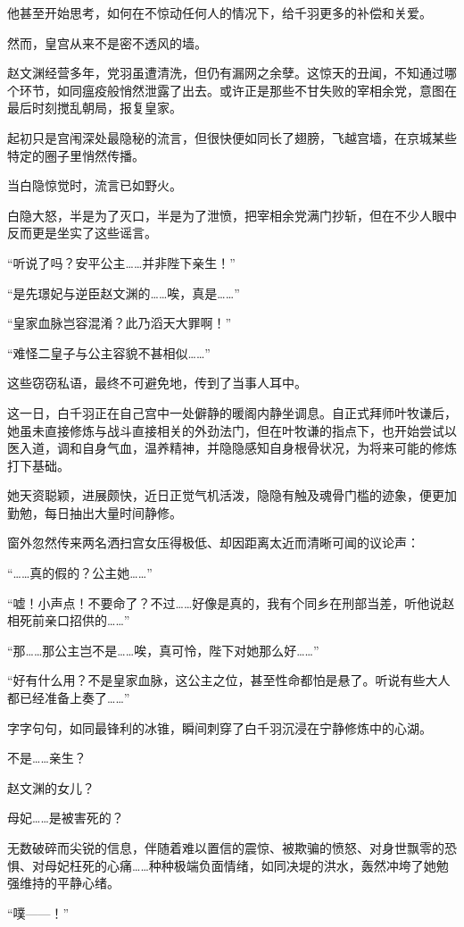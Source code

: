 他甚至开始思考，如何在不惊动任何人的情况下，给千羽更多的补偿和关爱。

然而，皇宫从来不是密不透风的墙。

赵文渊经营多年，党羽虽遭清洗，但仍有漏网之余孽。这惊天的丑闻，不知通过哪个环节，如同瘟疫般悄然泄露了出去。或许正是那些不甘失败的宰相余党，意图在最后时刻搅乱朝局，报复皇家。

起初只是宫闱深处最隐秘的流言，但很快便如同长了翅膀，飞越宫墙，在京城某些特定的圈子里悄然传播。

当白隐惊觉时，流言已如野火。

白隐大怒，半是为了灭口，半是为了泄愤，把宰相余党满门抄斩，但在不少人眼中反而更是坐实了这些谣言。

“听说了吗？安平公主……并非陛下亲生！”

“是先璟妃与逆臣赵文渊的……唉，真是……”

“皇家血脉岂容混淆？此乃滔天大罪啊！”

“难怪二皇子与公主容貌不甚相似……”

这些窃窃私语，最终不可避免地，传到了当事人耳中。

这一日，白千羽正在自己宫中一处僻静的暖阁内静坐调息。自正式拜师叶牧谦后，她虽未直接修炼与战斗直接相关的外劲法门，但在叶牧谦的指点下，也开始尝试以医入道，调和自身气血，温养精神，并隐隐感知自身根骨状况，为将来可能的修炼打下基础。

她天资聪颖，进展颇快，近日正觉气机活泼，隐隐有触及魂骨门槛的迹象，便更加勤勉，每日抽出大量时间静修。

窗外忽然传来两名洒扫宫女压得极低、却因距离太近而清晰可闻的议论声：

“……真的假的？公主她……”

“嘘！小声点！不要命了？不过……好像是真的，我有个同乡在刑部当差，听他说赵相死前亲口招供的……”

“那……那公主岂不是……唉，真可怜，陛下对她那么好……”

“好有什么用？不是皇家血脉，这公主之位，甚至性命都怕是悬了。听说有些大人都已经准备上奏了……”

字字句句，如同最锋利的冰锥，瞬间刺穿了白千羽沉浸在宁静修炼中的心湖。

不是……亲生？

赵文渊的女儿？

母妃……是被害死的？

无数破碎而尖锐的信息，伴随着难以置信的震惊、被欺骗的愤怒、对身世飘零的恐惧、对母妃枉死的心痛……种种极端负面情绪，如同决堤的洪水，轰然冲垮了她勉强维持的平静心绪。

“噗——！”

